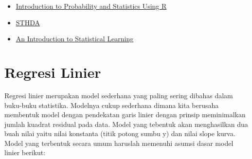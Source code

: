 \documentclass[]{book}
\providecommand{\tightlist}{%
  \setlength{\itemsep}{0pt}\setlength{\parskip}{0pt}}
\theoremstyle{definition}
\theoremstyle{definition}
\theoremstyle{definition}
\theoremstyle{remark}
\begin{document}
\begin{itemize}
\tightlist
\item
  \href{http://ipsur.r-forge.r-project.org/book/download/IPSUR.pdf}{Introduction to Probability and Statistics Using R}
\item
  \href{http://www.sthda.com/english/}{STHDA}
\item
  \href{https://faculty.marshall.usc.edu/gareth-james/ISL/ISLR\%20Seventh\%20Printing.pdf}{An Introduction to Statistical Learning}
\end{itemize}

\hypertarget{reglin}{%
\section{Regresi Linier}\label{reglin}}

Regresi linier merupakan model sederhana yang paling sering dibahas dalam buku-buku statistika. Modelnya cukup sederhana dimana kita berusaha membentuk model dengan pendekatan garis linier dengan prinsip meminimalkan jumlah kuadrat residual pada data. Model yang tebentuk akan menghasilkan dua buah nilai yaitu nilai konstanta (titik potong sumbu y) dan nilai slope kurva. Model yang terbentuk secara umum haruslah memenuhi asumsi dasar model linier berikut:
\end{document}
